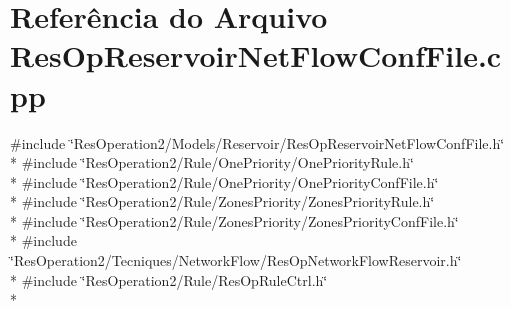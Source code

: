 \section{Referência do Arquivo Res\+Op\+Reservoir\+Net\+Flow\+Conf\+File.\+cpp}
\label{_res_op_reservoir_net_flow_conf_file_8cpp}
{\ttfamily \#include \char`\"{}Res\+Operation2/\+Models/\+Reservoir/\+Res\+Op\+Reservoir\+Net\+Flow\+Conf\+File.\+h\char`\"{}}\\*
{\ttfamily \#include \char`\"{}Res\+Operation2/\+Rule/\+One\+Priority/\+One\+Priority\+Rule.\+h\char`\"{}}\\*
{\ttfamily \#include \char`\"{}Res\+Operation2/\+Rule/\+One\+Priority/\+One\+Priority\+Conf\+File.\+h\char`\"{}}\\*
{\ttfamily \#include \char`\"{}Res\+Operation2/\+Rule/\+Zones\+Priority/\+Zones\+Priority\+Rule.\+h\char`\"{}}\\*
{\ttfamily \#include \char`\"{}Res\+Operation2/\+Rule/\+Zones\+Priority/\+Zones\+Priority\+Conf\+File.\+h\char`\"{}}\\*
{\ttfamily \#include \char`\"{}Res\+Operation2/\+Tecniques/\+Network\+Flow/\+Res\+Op\+Network\+Flow\+Reservoir.\+h\char`\"{}}\\*
{\ttfamily \#include \char`\"{}Res\+Operation2/\+Rule/\+Res\+Op\+Rule\+Ctrl.\+h\char`\"{}}\\*
